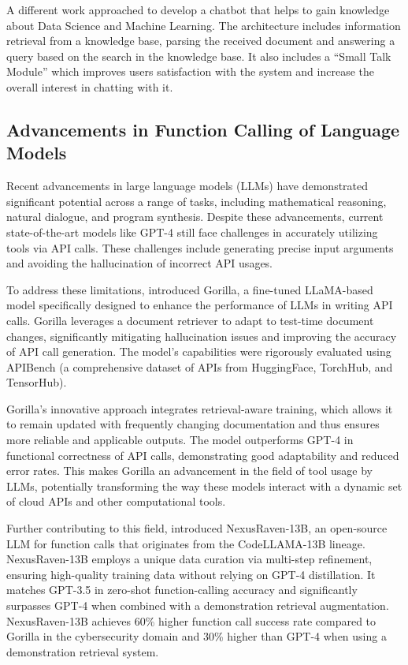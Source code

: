 A different work \cite{carlander-reuterfelt_jaicob_2020} approached to develop a chatbot that helps to gain knowledge about Data Science and Machine Learning.
The architecture includes information retrieval from a knowledge base, parsing the received document and answering a query based on the search in the knowledge base.
It also includes a ``Small Talk Module'' which improves users satisfaction with the system and increase the overall interest in chatting with it.

\subsection{Advancements in Function Calling of Language Models}

Recent advancements in large language models (LLMs) have demonstrated significant potential across a range of tasks, including mathematical reasoning, natural dialogue, and program synthesis. Despite these advancements, current state-of-the-art models like GPT-4 still face challenges in accurately utilizing tools via API calls. These challenges include generating precise input arguments and avoiding the hallucination of incorrect API usages.

To address these limitations, \citet{patil2023gorillalargelanguagemodel} introduced Gorilla, a fine-tuned LLaMA-based model specifically designed to enhance the performance of LLMs in writing API calls. Gorilla leverages a document retriever to adapt to test-time document changes, significantly mitigating hallucination issues and improving the accuracy of API call generation. The model's capabilities were rigorously evaluated using APIBench (a comprehensive dataset of APIs from HuggingFace, TorchHub, and TensorHub).

Gorilla's innovative approach integrates retrieval-aware training, which allows it to remain updated with frequently changing documentation and thus ensures more reliable and applicable outputs. The model outperforms GPT-4 in functional correctness of API calls, demonstrating good adaptability and reduced error rates. This makes Gorilla an advancement in the field of tool usage by LLMs, potentially transforming the way these models interact with a dynamic set of cloud APIs and other computational tools.

Further contributing to this field, \citet{srinivasan2023nexusraven} introduced NexusRaven-13B, an open-source LLM for function calls that originates from the CodeLLAMA-13B lineage. NexusRaven-13B employs a unique data curation via multi-step refinement, ensuring high-quality training data without relying on GPT-4 distillation. It matches GPT-3.5 in zero-shot function-calling accuracy and significantly surpasses GPT-4 when combined with a demonstration retrieval augmentation. NexusRaven-13B achieves 60\% higher function call success rate compared to Gorilla in the cybersecurity domain and 30\% higher than GPT-4 when using a demonstration retrieval system.

